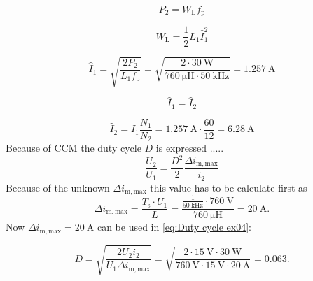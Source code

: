 \begin{solutionblock}
\begin{equation}
    P_\mathrm{2} = W_\mathrm{L} f_\mathrm{p}
\end{equation}

\begin{equation}
    W_\mathrm{L} = \frac{1}{2}L_\mathrm{1}\hat I_\mathrm{1}^2 
\end{equation}

\begin{equation}
    \hat I_\mathrm{1} = \sqrt{\frac{2P_\mathrm{2}}{L_\mathrm{1}f_\mathrm{p}}}= \sqrt{\frac{2\cdot\SI{30}{\watt}}{\SI{760}{\micro\henry}\cdot\SI{50}{\kilo\hertz}}}=\SI{1.257}{\ampere}
\end{equation}

\begin{equation}
    \hat I_\mathrm{1} = \hat I_\mathrm{2}
\end{equation}

\begin{equation}
    \hat I_\mathrm{2} = \hat I_\mathrm{1} \frac{N_\mathrm{1}}{N_\mathrm{2}} = \SI{1.257}{\ampere} \cdot \frac{60}{12} = \SI{6.28}{\ampere}
\end{equation}
Because of CCM the duty cycle $D$ is expressed .....
\begin{equation}
    \frac{U_2}{U_1} = \frac{D^2}{2} \frac{\Delta i_\mathrm{m,max}}{\overline{i}_2} \label{eq:Duty cycle ex04}
\end{equation}
Because of the unknown $\Delta i_\mathrm{m,max}$ this value has to be calculate first as
\begin{equation}
    \Delta i_\mathrm{m,max}= \frac{T_\mathrm{s} \cdot U_1}{L} = \frac{\frac{1}{\SI{50}{\kilo\hertz}}\cdot \SI{760}{\volt}}{\SI{760}{\micro\henry}}=\SI{20}{\ampere}.
\end{equation}
Now $\Delta i_\mathrm{m,max}=\SI{20}{\ampere}$ can be used in \eqref{eq:Duty cycle ex04}:

\begin{equation}
    D = \sqrt{\frac{2U_2\overline{i}_2}{U_1\Delta i_\mathrm{m,max}}} = \sqrt{\frac{2\cdot \SI{15}{\volt}\cdot\SI{30}{\watt}}{\SI{760}{\volt}\cdot\SI{15}{\volt}\cdot\SI{20}{\ampere}}} = 0.063.
\end{equation}

\end{solutionblock}


